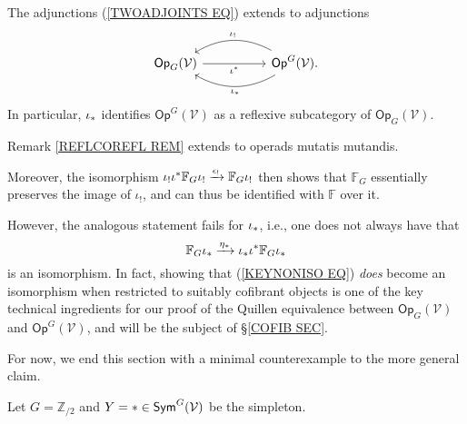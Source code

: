 \documentclass[a4paper,10pt]{article}%
\begin{document}
\begin{corollary}
	The adjunctions (\ref{TWOADJOINTS EQ}) extends to  adjunctions
\begin{equation}\label{TWOADJOINTSOP EQ}
\begin{tikzcd}[column sep =5em]
	\mathsf{Op}_G(\mathcal{V}) \ar{r}[swap]{\iota^{\**}} 
	&
	\mathsf{Op}^G(\mathcal{V})
	\ar[bend right]{l}[swap,midway]{\iota_{!}}
	\ar[bend left]{l}{\iota_{\**}}.
\end{tikzcd}
\end{equation}
In particular, $\iota_{\**}$
identifies $\mathsf{Op}^G(\mathcal{V})$ as a reflexive subcategory of 
$\mathsf{Op}_G(\mathcal{V})$.
\end{corollary}

\begin{remark}
	Remark \ref{REFLCOREFL REM} extends to operads mutatis mutandis.
	
Moreover, the isomorphism
	$\iota_{!}\iota^{\**} \mathbb{F}_G \iota_{!}
	\xrightarrow{\epsilon_!}
	\mathbb{F}_G \iota_{!}$
then shows that $\mathbb{F}_G$ essentially preserves the image of $\iota_!$, and can thus be identified with $\mathbb{F}$ over it.

However, the analogous statement fails for $\iota_{\**}$, i.e., one does not always have that
\begin{equation}\label{KEYNONISO EQ}
	\mathbb{F}_G \iota_{\**}
	\xrightarrow{\eta_{\**}}
	\iota_{\**}\iota^{\**} \mathbb{F}_G \iota_{\**}
\end{equation}
is an isomorphism. 
In fact, showing that (\ref{KEYNONISO EQ})
\textit{does} become an isomorphism when restricted to suitably cofibrant objects is one of the key technical ingredients for our proof of the Quillen equivalence between 
$\mathsf{Op}_G(\mathcal{V})$ and
$\mathsf{Op}^G(\mathcal{V})$, 
and will be the subject of \S \ref{COFIB SEC}.

For now, we end this section with a minimal counterexample to  the more general claim.

Let $G=\mathbb{Z}_{/2}$ and 
$Y=\** \in \mathsf{Sym}^G(\mathcal{V})$ be the simpleton.


\end{remark}
\end{document}
